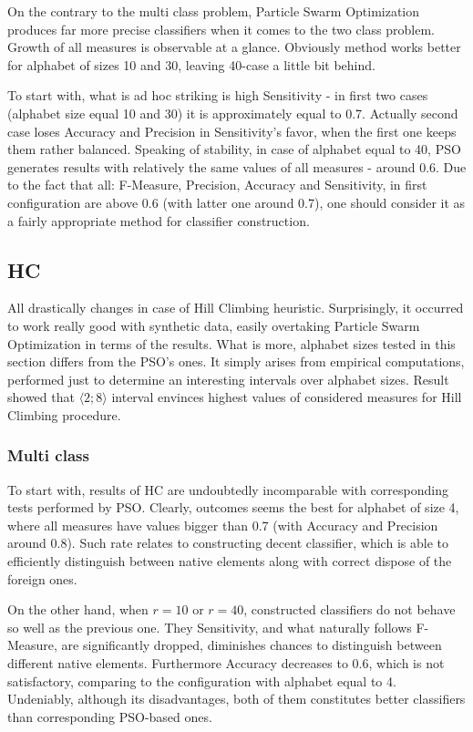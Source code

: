 \documentclass{mini}
\begin{document}
On the contrary to the multi class problem, Particle Swarm Optimization produces far more precise classifiers when it comes to the two class problem. Growth of all measures is observable at a glance. Obviously method works better for alphabet of sizes 10 and 30, leaving 40-case a little bit behind.

To start with, what is ad hoc striking is high Sensitivity - in first two cases (alphabet size equal 10 and 30) it is approximately equal to 0.7. Actually second case loses Accuracy and Precision in Sensitivity's favor, when the first one keeps them rather balanced. Speaking of stability, in case of alphabet equal to 40, PSO generates results with relatively the same values of all measures - around 0.6. Due to the fact that all: F-Measure, Precision, Accuracy and Sensitivity, in first configuration are above 0.6 (with latter one around 0.7), one should consider it as a fairly appropriate method for classifier construction.


\makeFigureSyntheticTwo

%
%
\subsection{HC}
All drastically changes in case of Hill Climbing heuristic. Surprisingly, it occurred to work really good with synthetic data, easily overtaking Particle Swarm Optimization in terms of the results. What is more, alphabet sizes tested in this section differs from the PSO's ones. It simply arises from empirical computations, performed just to determine an interesting intervals over alphabet sizes. Result showed that $\langle 2; 8 \rangle$ interval envinces highest values of considered measures for Hill Climbing procedure.

\subsubsection{Multi class}

\makeFigureHCSyntheticMulti
To start with, results of HC are undoubtedly incomparable with corresponding tests performed by PSO. Clearly, outcomes seems the best for alphabet of size 4, where all measures have values bigger than 0.7 (with Accuracy and Precision around 0.8). Such rate relates to constructing decent classifier, which is able to efficiently distinguish between native elements along with correct dispose of the foreign ones. 

On the other hand, when $r=10$ or $r=40$, constructed classifiers do not behave so well as the previous one. They Sensitivity, and what naturally follows F-Measure, are significantly dropped, diminishes chances to distinguish between different native elements. Furthermore Accuracy decreases to 0.6, which is not satisfactory, comparing to the configuration with alphabet equal to 4. Undeniably, although its disadvantages, both of them constitutes better classifiers than corresponding PSO-based ones.
\end{document}
